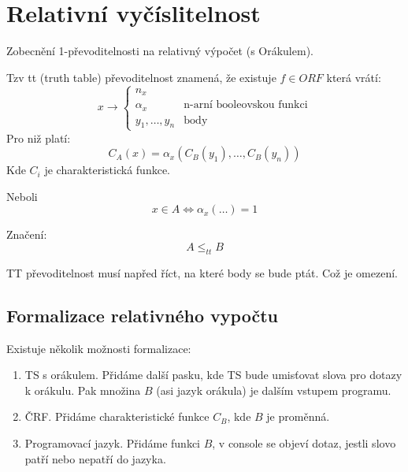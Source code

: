 \section{\texorpdfstring{Relativní vyčíslitelnost}{Relativní vyčíslitelnost}}
\vspace{5mm}
\large

Zobecnění 1-převoditelnosti na relativný výpočet (s Orákulem).

\begin{definition}[tt-Převoditelnost]
	Tzv tt (truth table) převoditelnost znamená, že existuje $f \in ORF$ která vrátí:
	\[ x \to
		\left\{
		\begin{array}{lll}
			n_x \\
			\alpha_x & \text{n-arní booleovskou funkci} \\
			y_1, \ldots, y_n & \text{body}
		\end{array}
		\right.
	\]
	Pro niž platí:
	\[ C_A(x) = \alpha_x(C_B(y_1), \ldots, C_B(y_n))\]
	Kde $C_i$ je charakteristická funkce.

	Neboli
	\[ x \in A \iff \alpha_x(\ldots) = 1 \]

	Značení:
	\[ A \leq_{tt} B \]
\end{definition}

\begin{note}
	TT převoditelnost musí napřed říct, na které body se bude ptát.
	Což je omezení.
\end{note}

\subsection{Formalizace relativného vypočtu}

Existuje několik možnosti formalizace:
\begin{definition}
	\begin{enumerate}
		\item TS s orákulem. Přidáme další pasku, kde TS bude umisťovat slova pro dotazy k orákulu.
			Pak množina $B$ (asi jazyk orákula) je dalším vstupem programu.
		\item ČRF. Přidáme charakteristické funkce $C_B$, kde $B$ je proměnná.
		\item Programovací jazyk. Přidáme funkci $B$, v console se objeví dotaz, jestli slovo patří nebo nepatří do jazyka.
	\end{enumerate}
\end{definition}

